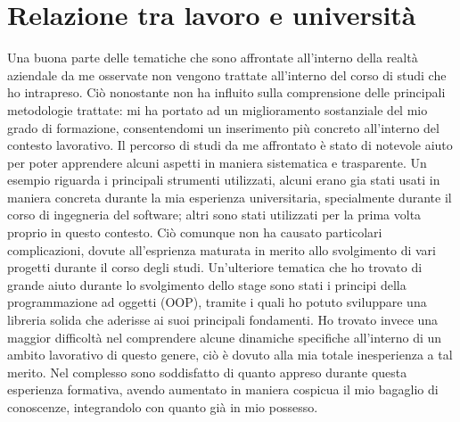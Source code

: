 \section{Relazione tra lavoro e università}
Una buona parte delle tematiche che sono affrontate all'interno della realtà aziendale da me osservate non vengono trattate all'interno del corso di studi che ho intrapreso. Ciò nonostante non ha influito sulla comprensione delle principali metodologie trattate: mi ha portato ad un miglioramento sostanziale del mio grado di formazione, consentendomi un inserimento più concreto all'interno del contesto lavorativo.
Il percorso di studi da me affrontato è stato di notevole aiuto per poter apprendere alcuni aspetti in maniera sistematica e trasparente. Un esempio riguarda i principali strumenti utilizzati, alcuni erano gia stati usati in maniera concreta durante la mia esperienza universitaria, specialmente durante il corso di ingegneria del software; altri sono stati utilizzati per la prima volta proprio in questo contesto. Ciò comunque non ha causato particolari complicazioni, dovute all'esprienza maturata in merito allo svolgimento di vari progetti durante il corso degli studi. Un'ulteriore tematica che ho trovato di grande aiuto durante lo svolgimento dello stage sono stati i principi della programmazione ad oggetti (\gls{OOP}), tramite i quali ho potuto sviluppare una libreria solida che aderisse ai suoi principali fondamenti. Ho trovato invece una maggior difficoltà nel comprendere alcune dinamiche specifiche all'interno di un ambito lavorativo di questo genere, ciò è dovuto alla mia totale inesperienza a tal merito. Nel complesso sono soddisfatto di quanto appreso durante questa esperienza formativa, avendo aumentato in maniera cospicua il mio bagaglio di conoscenze, integrandolo con quanto già in mio possesso. 
